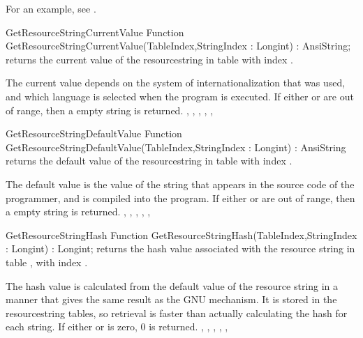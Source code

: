 For an example, see .

\begin{function}{GetResourceStringCurrentValue}
\Declaration
Function GetResourceStringCurrentValue(TableIndex,StringIndex : Longint) : AnsiString;
\Description
{} returns the current value of the
resourcestring in table  with index .

The current value depends on the system of internationalization that was
used, and which language is selected when the program is executed.
\Errors
If either  or  are out of range, then
a empty string is returned.
\SeeAlso
{},
,
,
,
,
\end{function}


\begin{function}{GetResourceStringDefaultValue}
\Declaration
Function GetResourceStringDefaultValue(TableIndex,StringIndex : Longint) : AnsiString
\Description
{} returns the default value of the
resourcestring in table  with index .

The default value is the value of the string that appears in the source code
of the programmer, and is compiled into the program.
\Errors
If either  or  are out of range, then
a empty string is returned.
\Errors
\SeeAlso
{},
,
,
,
,
\end{function}


\begin{function}{GetResourceStringHash}
\Declaration
Function GetResourceStringHash(TableIndex,StringIndex : Longint) : Longint;
\Description
{} returns the hash value associated with the
resource string in table , with index .

The hash value is calculated from the default value of the resource string
in a manner that gives the same result as the GNU  mechanism.
It is stored in the resourcestring tables, so retrieval is faster than
actually calculating the hash for each string.
\Errors
If either  or  is zero, 0 is returned.
\SeeAlso
{}
,
,
,
,
,
\end{function}

